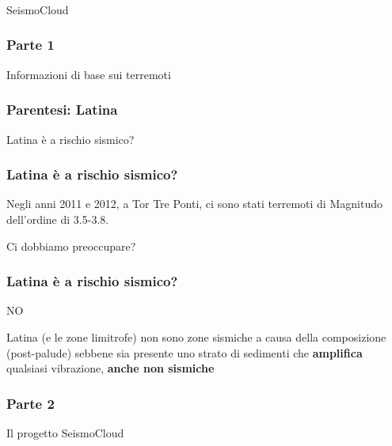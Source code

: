 \documentclass[10pt]{beamer}
\begin{document}
	\begin{frame}
		\frametitle{\hfill}
		
		\LARGE SeismoCloud		
		
	\end{frame}
	
	
	\begin{frame}
		\frametitle{Parte 1}
		\LARGE Informazioni di base sui terremoti
	\end{frame}
	
	
	
	
	
	
	
	
	
	
	
	\begin{frame}
		\frametitle{Parentesi: Latina}
		\LARGE Latina è a rischio sismico?
	\end{frame}
	
	\begin{frame}
		\frametitle{Latina è a rischio sismico?}
		
		\Large Negli anni 2011 e 2012, a Tor Tre Ponti, ci sono stati terremoti di Magnitudo dell'ordine di 3.5-3.8.
		
		\Large \pause Ci dobbiamo preoccupare?
		
	\end{frame}
	
	\begin{frame}
		\frametitle{Latina è a rischio sismico?}
		
		\LARGE NO
		
		\large Latina (e le zone limitrofe) non sono zone sismiche a causa della composizione (post-palude) sebbene sia presente uno strato di sedimenti che \textbf{amplifica} qualsiasi vibrazione, \textbf{anche non sismiche}
		
	\end{frame}
	
	
	\begin{frame}
		\frametitle{Parte 2}
		\LARGE Il progetto SeismoCloud
	\end{frame}
\end{document}
